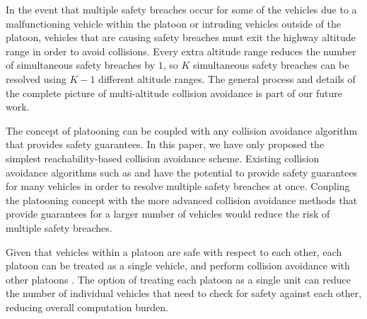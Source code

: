 In the event that multiple safety breaches occur for some of the vehicles due to a malfunctioning vehicle within the platoon or intruding vehicles outside of the platoon, vehicles that are causing safety breaches must exit the highway altitude range in order to avoid collisions. Every extra altitude range reduces the number of simultaneous safety breaches by $1$, so $K$ simultaneous safety breaches can be resolved using $K-1$ different altitude ranges. The general process and details of the complete picture of multi-altitude collision avoidance is part of our future work. 

The concept of platooning can be coupled with any collision avoidance algorithm that provides safety guarantees. In this paper, we have only proposed the simplest reachability-based collision avoidance scheme. Existing collision avoidance algorithms such as \cite{Bansal16} and \cite{Chen16} have the potential to provide safety guarantees for many vehicles in order to resolve multiple safety breaches at once. Coupling the platooning concept with the more advanced collision avoidance methods that provide guarantees for a larger number of vehicles would reduce the risk of multiple safety breaches.

Given that vehicles within a platoon are safe with respect to each other, each platoon can be treated as a single vehicle, and perform collision avoidance with other platoons . The option of treating each platoon as a single unit can reduce the number of individual vehicles that need to check for safety against each other, reducing overall computation burden.